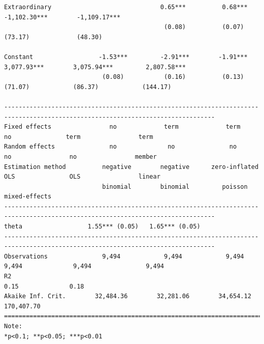 \documentclass[letter,12pt]{article}
\begin{document}
\begin{table}
\begin{tiny}
\begin{verbatim}
Extraordinary                              0.65***          0.68***                         -1,102.30***        -1,109.17***  
                                            (0.08)          (0.07)                             (73.17)             (48.30)    
                                                                                                                              
Constant                  -1.53***         -2.91***        -1.91***       3,077.93***        3,075.94***         2,807.58***  
                           (0.08)           (0.16)          (0.13)          (71.07)            (86.37)            (144.17)    
                                                                                                                              
--------------------------------------------------------------------------------------------------------------------------------
Fixed effects                no             term             term              no               term                term      
Random effects               no              no               no               no                no                member     
Estimation method          negative        negative      zero-inflated        OLS               OLS                linear     
                           binomial        binomial         poisson                                             mixed-effects 
--------------------------------------------------------------------------------------------------------------------------------
theta                  1.55*** (0.05)   1.65*** (0.05)                                                                        
--------------------------------------------------------------------------------------------------------------------------------
Observations               9,494            9,494            9,494           9,494              9,494               9,494     
R2                                                                            0.15              0.18                          
Akaike Inf. Crit.        32,484.36        32,281.06        34,654.12                                             170,407.70    
================================================================================================================================
Note:                                                                                                *p<0.1; **p<0.05; ***p<0.01
\end{verbatim}
  \end{tiny}
  \caption{Models of legislative debate (standard errors in parentheses)} 
  \label{T:regs} 
\end{table} 
\end{document}

